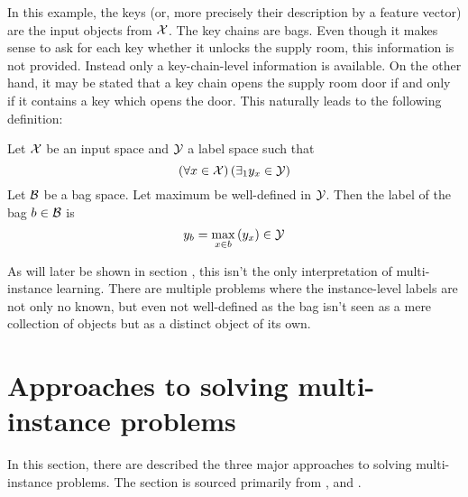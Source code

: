 In this example, the keys (or, more precisely their description by a feature vector) are the input objects from \( \mathcal{X} \). The key chains are bags. Even though it makes sense to ask for each key whether it unlocks the supply room, this information is not provided. Instead only a key-chain-level information is available. On the other hand, it may be stated that a key chain opens the supply room door if and only if it contains a key which opens the door. This naturally leads to the following definition:

\begin{define}
	Let \( \mathcal{X} \) be an input space and \( \mathcal{Y} \) a label space such that
	\[ \left( \forall x \in \mathcal{X} \right) \left( \exists_1 y_x \in \mathcal{Y} \right) \]
	Let \( \mathcal{B} \) be a bag space. Let maximum be well-defined in \( \mathcal{Y} \). Then the label of the bag \( b \in \mathcal{B} \) is
	\[ y_b = \max_{x \in b} \left( y_x \right) \in \mathcal{Y} \]
\end{define}

As will later be shown in section , this isn't the only interpretation of multi-instance learning. There are multiple problems  where the instance-level labels are not only no known, but even not well-defined as the bag isn't seen as a mere collection of objects but as a distinct object of its own.

\section{Approaches to solving multi-instance problems}
In this section, there are described the three major approaches to solving multi-instance problems. The section is sourced primarily from \cite{pevny_using_2017}, \cite{pevny_discriminative_2016} and \cite{amores_multiple_2013}. 
